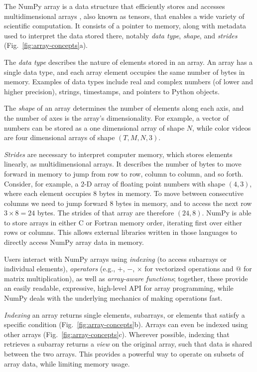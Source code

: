The NumPy array is a data structure that efficiently stores and accesses
multidimensional arrays \cite{vanderwalt2011numpy}, also known as tensors, that
enables a wide variety of scientific computation.
It consists of a pointer to memory, along with metadata used to interpret the
data stored there, notably {\em data type}, {\em shape}, and {\em strides}
(Fig.~\ref{fig:array-concepts}a).

The \emph{data type} describes the nature of elements stored in an array.
An array has a single data type, and each array element occupies the same
number of bytes in memory.
Examples of data types include real and complex numbers (of lower and higher
precision), strings, timestamps, and pointers to Python objects.

The \emph{shape} of an array determines the number of elements along each axis,
and the number of axes is the array's dimensionality.
For example, a vector of numbers can be stored as a one dimensional array of
shape $N$, while color videos are four dimensional arrays of shape
$(T, M, N, 3)$.

\emph{Strides} are necessary to interpret computer memory, which stores elements
linearly, as multidimensional arrays.
It describes the number of bytes to move forward in memory to jump from row to
row, column to column, and so forth.
Consider, for example, a 2-D array of floating point numbers with shape
$(4, 3)$, where each element occupies 8 bytes in memory.
To move between consecutive columns we need to jump forward 8 bytes in memory,
and to access the next row $3 \times 8 = 24$ bytes.
The strides of that array are therefore $(24, 8)$.  NumPy is able to
store arrays in either C or Fortran memory order, iterating
first over either rows or columns.  This allows external libraries
written in those languages to directly access NumPy array data in memory.

Users interact with NumPy arrays using {\em indexing} (to access
subarrays or individual elements), {\em operators} (e.g., $+$, $-$, $\times$
for vectorized operations and $@$ for matrix multiplication), as well as {\em array-aware functions};
together, these provide an easily readable, expressive, high-level API for
array programming, while NumPy
deals with the underlying mechanics of making operations fast.

\emph{Indexing} an array returns single elements, subarrays, or elements that satisfy
a specific condition (Fig.~\ref{fig:array-concepts}b).
Arrays can even be indexed using other arrays (Fig.~\ref{fig:array-concepts}c).
Wherever possible, indexing that retrieves a subarray returns a {\em view} on
the original array, such that data is shared between the two arrays.
This provides a powerful way to operate on subsets of array data, while
limiting memory usage.

